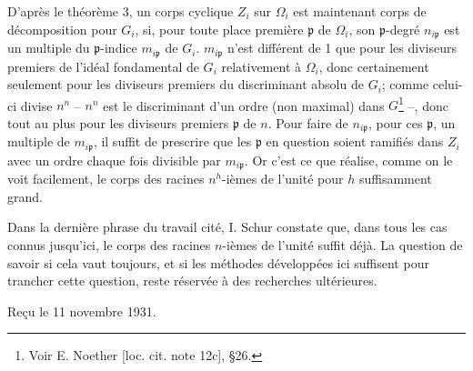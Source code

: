 D'après le théorème 3, un corps cyclique \(Z_i\) sur \(\Omega_i\) est maintenant corps de décomposition pour \(G_i\), si, pour toute place première \(\mathfrak p\) de \(\Omega_i\), son \(\mathfrak p\)-degré \(n_{i\mathfrak p}\) est un multiple du \(\mathfrak p\)-indice \(m_{i\mathfrak p}\) de \(G_i\). \(m_{i\mathfrak p}\) n'est différent de 1 que pour les diviseurs premiers de l'idéal fondamental de \(G_i\) relativement à \(\Omega_i\), donc certainement seulement pour les diviseurs premiers du discriminant absolu de \(G_i\); comme celui-ci divise \(n^n\) -- \(n^n\) est le discriminant d'un ordre (non maximal) dans \(G\)\footnote{Voir E. Noether [loc. cit. note 12c], \S 26.} --, donc tout au plus pour les diviseurs premiers \(\mathfrak p\) de \(n\). Pour faire de \(n_{i\mathfrak p}\), pour ces \(\mathfrak p\), un multiple de \(m_{i\mathfrak p}\), il suffit de prescrire que les \(\mathfrak p\) en question soient ramifiés dans \(Z_i\) avec un ordre chaque fois divisible par \(m_{i\mathfrak p}\). Or c'est ce que réalise, comme on le voit facilement, le corps des racines \(n^h\)-ièmes de l'unité pour \(h\) suffisamment grand.

Dans la dernière phrase du travail cité, I. Schur constate que, dans tous les cas connus jusqu'ici, le corps des racines \(n\)-ièmes de l'unité suffit déjà. La question de savoir si cela vaut toujours, et si les méthodes développées ici suffisent pour trancher cette question, reste réservée à des recherches ultérieures.

\begin{center}
Reçu le 11 novembre 1931.
\end{center}

\setcounter{footnote}{0}
\clearpage
